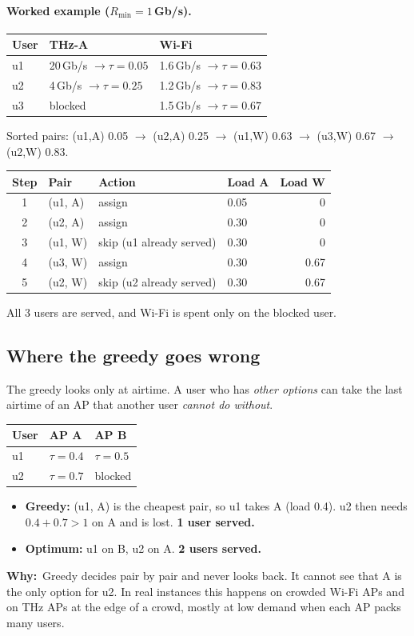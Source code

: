 \documentclass[11pt,a4paper]{article}
\newcommand{\Rmin}{R_{\min}}
\newcommand{\why}[1]{\par\smallskip\noindent\begin{minipage}{\linewidth}\small
  \textcolor{whyc}{\textbf{Why:}}~#1\end{minipage}\par\medskip}
\begin{document}
\paragraph{Worked example ($\Rmin=1$\,Gb/s).}
\begin{center}
\begin{tabular}{@{}lll@{}}
\toprule
User & THz-A & Wi-Fi\\
\midrule
u1 & 20\,Gb/s $\to\tau=0.05$ & 1.6\,Gb/s $\to\tau=0.63$\\
u2 & 4\,Gb/s $\to\tau=0.25$ & 1.2\,Gb/s $\to\tau=0.83$\\
u3 & blocked & 1.5\,Gb/s $\to\tau=0.67$\\
\bottomrule
\end{tabular}
\end{center}
Sorted pairs: (u1,A) 0.05 $\to$ (u2,A) 0.25 $\to$ (u1,W) 0.63 $\to$ (u3,W) 0.67 $\to$ (u2,W) 0.83.
\begin{center}
\begin{tabular}{@{}clllr@{}}
\toprule
Step & Pair & Action & Load A & Load W\\
\midrule
1 & (u1, A) & assign & 0.05 & 0\\
2 & (u2, A) & assign & 0.30 & 0\\
3 & (u1, W) & skip (u1 already served) & 0.30 & 0\\
4 & (u3, W) & assign & 0.30 & 0.67\\
5 & (u2, W) & skip (u2 already served) & 0.30 & 0.67\\
\bottomrule
\end{tabular}
\end{center}
All 3 users are served, and Wi-Fi is spent only on the blocked user.

\subsection{Where the greedy goes wrong}
The greedy looks only at airtime. A user who has \emph{other options} can take the last
airtime of an AP that another user \emph{cannot do without}.
\begin{center}
\begin{tabular}{@{}lll@{}}
\toprule
User & AP A & AP B\\
\midrule
u1 & $\tau=0.4$ & $\tau=0.5$\\
u2 & $\tau=0.7$ & blocked\\
\bottomrule
\end{tabular}
\end{center}
\begin{itemize}
\item \textbf{Greedy:} (u1, A) is the cheapest pair, so u1 takes A (load 0.4). u2 then needs
  $0.4+0.7>1$ on A and is lost. \textbf{1 user served.}
\item \textbf{Optimum:} u1 on B, u2 on A. \textbf{2 users served.}
\end{itemize}
\why{Greedy decides pair by pair and never looks back. It cannot see that A is the only option for u2. In real instances this happens on crowded Wi-Fi APs and on THz APs at the edge of a crowd, mostly at low demand when each AP packs many users.}
\end{document}
